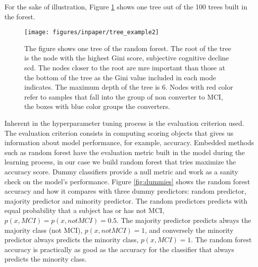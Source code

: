 \documentclass[preprint,12pt]{elsarticle}
\begin{document}

For the sake of illustration, Figure \ref{fig:one_tree} shows one tree out of the 100 trees built in the forest. 
\begin{figure}[!htb]
        \centering
        \texttt{[image: figures/inpaper/tree\_example2]}
        \caption{The figure shows one tree of the random forest. The root of the tree is the node with the highest Gini score, subjective cognitive decline scd.
        The nodes closer to the root are mre important than those at the bottom of the tree as the Gini value included in each mode indicates. 
        The maximum depth of the tree is 6. Nodes with red color refer to samples that fall into the group of non converter to MCI, the boxes with blue color groups the converters.} 
        \label{fig:one_tree}
\end{figure}

Inherent in the hyperparameter tuning process is the evaluation criterion used. 
The evaluation criterion consists in computing scoring objects that gives us information about model performance, for example, accuracy. Embedded methods such as random forest have the evaluation metric built in the model during the learning process, in our case we build random forest that tries maximize the accuracy score.
Dummy classifiers provide a null metric and work as a sanity check on the model’s performance. Figure \ref{fig:dummies} shows the random forest accuracy and how it compares with three dummy predictors: random predictor, majority predictor and minority predictor. The random predictors predicts with equal probability that a subject has or has not MCI, $p(x, MCI)=p(x, not MCI) = 0.5$. The majority predictor predicts always the majority class (not MCI), $p(x, not MCI)=1$, and conversely the minority predictor always predicts the minority class, $p(x, MCI)=1$. The random forest accuracy is practically as good as the accuracy for the classifier that always predicts the minority class. 
\end{document}

